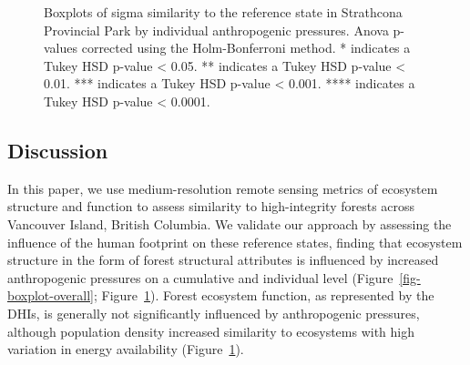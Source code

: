 \documentclass[
]{agujournal2019}
\begin{document}
\label{cell-fig-boxplot-individual}
\begin{figure}[H]


\caption{\label{fig-boxplot-individual}Boxplots of sigma similarity to
the reference state in Strathcona Provincial Park by individual
anthropogenic pressures. Anova p-values corrected using the
Holm-Bonferroni method. * indicates a Tukey HSD p-value \textless{}
0.05. ** indicates a Tukey HSD p-value \textless{} 0.01. *** indicates a
Tukey HSD p-value \textless{} 0.001. **** indicates a Tukey HSD p-value
\textless{} 0.0001.}

\end{figure}%

\subsection{Discussion}\label{discussion}

In this paper, we use medium-resolution remote sensing metrics of
ecosystem structure and function to assess similarity to high-integrity
forests across Vancouver Island, British Columbia. We validate our
approach by assessing the influence of the human footprint on these
reference states, finding that ecosystem structure in the form of forest
structural attributes is influenced by increased anthropogenic pressures
on a cumulative and individual level (Figure~\ref{fig-boxplot-overall};
Figure~\ref{fig-boxplot-individual}). Forest ecosystem function, as
represented by the DHIs, is generally not significantly influenced by
anthropogenic pressures, although population density increased
similarity to ecosystems with high variation in energy availability
(Figure~\ref{fig-boxplot-individual}).
\end{document}
